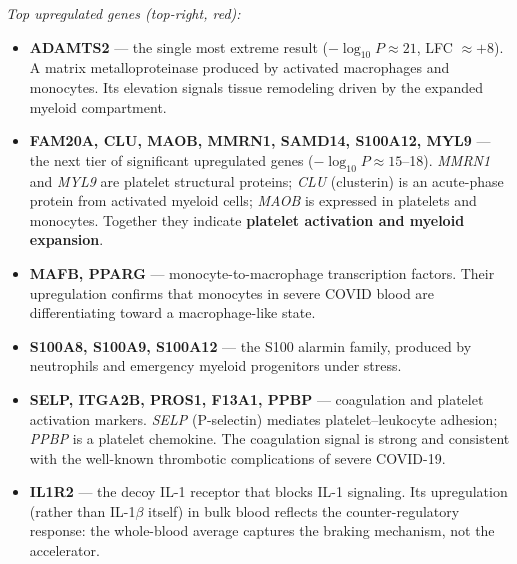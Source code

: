 \documentclass[11pt, a4paper]{article}
\begin{document}
\textit{Top upregulated genes (top-right, red):}
\begin{itemize}[nosep]
  \item \textbf{ADAMTS2} — the single most extreme result ($-\log_{10}P \approx 21$,
        LFC $\approx +8$). A matrix metalloproteinase produced by activated
        macrophages and monocytes. Its elevation signals tissue remodeling
        driven by the expanded myeloid compartment.
  \item \textbf{FAM20A, CLU, MAOB, MMRN1, SAMD14, S100A12, MYL9} — the next tier
        of significant upregulated genes ($-\log_{10}P \approx 15$--18).
        \textit{MMRN1} and \textit{MYL9} are platelet structural proteins;
        \textit{CLU} (clusterin) is an acute-phase protein from activated myeloid cells;
        \textit{MAOB} is expressed in platelets and monocytes.
        Together they indicate \textbf{platelet activation and myeloid expansion}.
  \item \textbf{MAFB, PPARG} — monocyte-to-macrophage transcription factors.
        Their upregulation confirms that monocytes in severe COVID blood are
        differentiating toward a macrophage-like state.
  \item \textbf{S100A8, S100A9, S100A12} — the S100 alarmin family, produced
        by neutrophils and emergency myeloid progenitors under stress.
  \item \textbf{SELP, ITGA2B, PROS1, F13A1, PPBP} — coagulation and platelet
        activation markers. \textit{SELP} (P-selectin) mediates
        platelet--leukocyte adhesion; \textit{PPBP} is a platelet chemokine.
        The coagulation signal is strong and consistent with the well-known
        thrombotic complications of severe COVID-19.
  \item \textbf{IL1R2} — the decoy IL-1 receptor that blocks IL-1 signaling.
        Its upregulation (rather than IL-1$\beta$ itself) in bulk blood reflects
        the counter-regulatory response: the whole-blood average captures the
        braking mechanism, not the accelerator.
\end{itemize}
\end{document}
